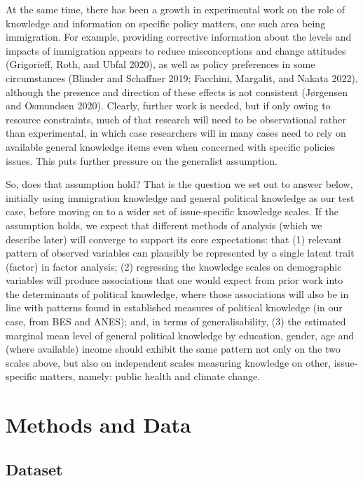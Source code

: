 \documentclass[12pt,halfline,a4paper,]{ouparticle}
\begin{document}
At the same time, there has been a growth in experimental work on the
role of knowledge and information on specific policy matters, one such
area being immigration. For example, providing corrective information
about the levels and impacts of immigration appears to reduce
misconceptions and change attitudes (Grigorieff, Roth, and Ubfal 2020),
as well as policy preferences in some circumstances (Blinder and
Schaffner 2019; Facchini, Margalit, and Nakata 2022), although the
presence and direction of these effects is not consistent (Jørgensen and
Osmundsen 2020). Clearly, further work is needed, but if only owing to
resource constraints, much of that research will need to be
observational rather than experimental, in which case researchers will
in many cases need to rely on available general knowledge items even
when concerned with specific policies issues. This puts further pressure
on the generalist assumption.

So, does that assumption hold? That is the question we set out to answer
below, initially using immigration knowledge and general political
knowledge as our test case, before moving on to a wider set of
issue-specific knowledge scales. If the assumption holds, we expect that
different methods of analysis (which we describe later) will converge to
support its core expectations: that (1) relevant pattern of observed
variables can plausibly be represented by a single latent trait (factor)
in factor analysis; (2) regressing the knowledge scales on demographic
variables will produce associations that one would expect from prior
work into the determinants of political knowledge, where those
associations will also be in line with patterns found in established
measures of political knowledge (in our case, from BES and ANES); and,
in terms of generalisability, (3) the estimated marginal mean level of
general political knowledge by education, gender, age and (where
available) income should exhibit the same pattern not only on the two
scales above, but also on independent scales measuring knowledge on
other, issue-specific matters, namely: public health and climate change.

\hypertarget{methods-and-data}{%
\section{Methods and Data}\label{methods-and-data}}

\hypertarget{dataset}{%
\subsection{Dataset}\label{dataset}}
\end{document}
